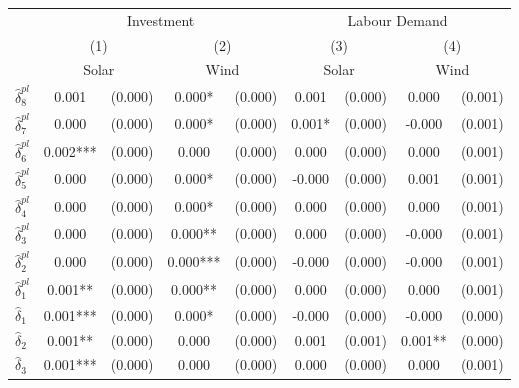 {
\def\sym#1{\ifmmode^{#1}\else\(^{#1}\)\fi}
\begin{tabular}{l*{4}{cc}}
\toprule
            &\multicolumn{4}{c}{Investment}                           &\multicolumn{4}{c}{Labour Demand}                        \\\cmidrule(lr){2-5}\cmidrule(lr){6-9}
            &\multicolumn{2}{c}{(1)}     &\multicolumn{2}{c}{(2)}     &\multicolumn{2}{c}{(3)}     &\multicolumn{2}{c}{(4)}     \\
            &\multicolumn{2}{c}{Solar}   &\multicolumn{2}{c}{Wind}    &\multicolumn{2}{c}{Solar}   &\multicolumn{2}{c}{Wind}    \\
\midrule
$\hat{\delta}_8^{pl}$&       0.001   &     (0.000)&       0.000*  &     (0.000)&       0.001   &     (0.000)&       0.000   &     (0.001)\\
$\hat{\delta}_7^{pl}$&       0.000   &     (0.000)&       0.000*  &     (0.000)&       0.001*  &     (0.000)&      -0.000   &     (0.001)\\
$\hat{\delta}_6^{pl}$&       0.002***&     (0.000)&       0.000   &     (0.000)&       0.000   &     (0.000)&       0.000   &     (0.001)\\
$\hat{\delta}_5^{pl}$&       0.000   &     (0.000)&       0.000*  &     (0.000)&      -0.000   &     (0.000)&       0.001   &     (0.001)\\
$\hat{\delta}_4^{pl}$&       0.000   &     (0.000)&       0.000*  &     (0.000)&       0.000   &     (0.000)&       0.000   &     (0.001)\\
$\hat{\delta}_3^{pl}$&       0.000   &     (0.000)&       0.000** &     (0.000)&       0.000   &     (0.000)&      -0.000   &     (0.001)\\
$\hat{\delta}_2^{pl}$&       0.000   &     (0.000)&       0.000***&     (0.000)&      -0.000   &     (0.000)&      -0.000   &     (0.001)\\
$\hat{\delta}_1^{pl}$&       0.001** &     (0.000)&       0.000** &     (0.000)&       0.000   &     (0.000)&       0.000   &     (0.001)\\
$\hat{\delta}_1$&       0.001***&     (0.000)&       0.000*  &     (0.000)&      -0.000   &     (0.000)&      -0.000   &     (0.000)\\
$\hat{\delta}_2$&       0.001** &     (0.000)&       0.000   &     (0.000)&       0.001   &     (0.001)&       0.001** &     (0.000)\\
$\hat{\delta}_3$&       0.001***&     (0.000)&       0.000   &     (0.000)&       0.000   &     (0.000)&       0.000   &     (0.001)\\

\end{tabular}}
